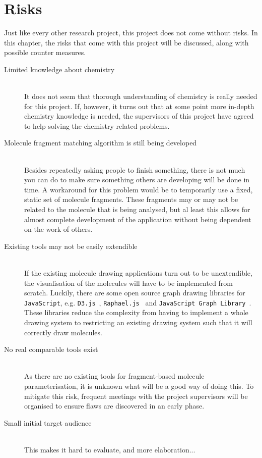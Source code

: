 \chapter{Risks}

Just like every other research project, this project does not come without risks. In this chapter, the risks that come with this project will be discussed, along with possible counter measures.

\begin{description}
\item[Limited knowledge about chemistry]~~\\
It does not seem that thorough understanding of chemistry is really needed for this project. If, however, it turns out that at some point more in-depth chemistry knowledge is needed, the supervisors of this project have agreed to help solving the chemistry related problems.

\item[Molecule fragment matching algorithm is still being developed]~~\\
Besides repeatedly asking people to finish something, there is not much you can do to make sure something others are developing will be done in time. A workaround for this problem would be to temporarily use a fixed, static set of molecule fragments. These fragments may or may not be related to the molecule that is being analysed, but al least this allows for almost complete development of the application without being dependent on the work of others.

\item[Existing tools may not be easily extendible]~~\\
If the existing molecule drawing applications turn out to be unextendible, the visualisation of the molecules will have to be implemented from scratch. Luckily, there are some open source graph drawing libraries for \verb|JavaScript|, e.g. \verb|D3.js|~\cite{bostock2012data}, \verb|Raphael.js|~\cite{baranovski2013raphael} and \verb|JavaScript Graph Library|~\cite{dracula2012javascript}. These libraries reduce the complexity from having to implement a whole drawing system to restricting an existing drawing system such that it will correctly draw molecules. 

\item[No real comparable tools exist]~~\\
As there are no existing tools for fragment-based molecule parameterisation, it is unknown what will be a good way of doing this. To mitigate this risk, frequent meetings with the project supervisors will be organised to ensure flaws are discovered in an early phase.

\item[Small initial target audience]~~\\
This makes it hard to evaluate, and more elaboration...
\end{description}
